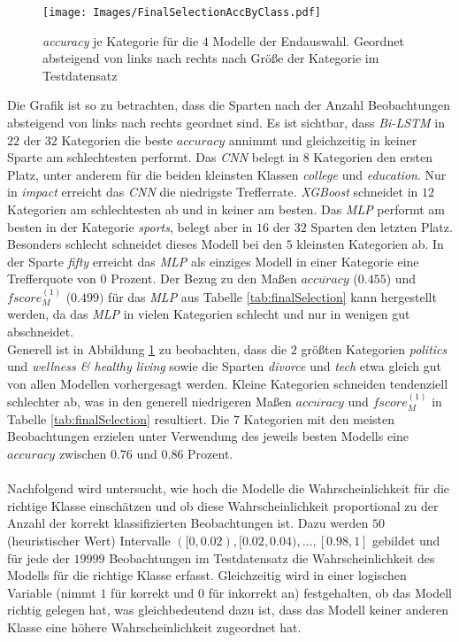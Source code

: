 \documentclass[a4paper,11pt]{article}
\begin{document}
\begin{figure}[ht]
    \centering
\texttt{[image: Images/FinalSelectionAccByClass.pdf]} 
\caption{\textit{accuracy} je Kategorie für die $4$ Modelle der Endauswahl. Geordnet absteigend von links nach rechts nach Größe der Kategorie im Testdatensatz}
\label{abb:AccByClass}
\end{figure}

Die Grafik ist so zu betrachten, dass die Sparten nach der Anzahl Beobachtungen absteigend von links nach rechts geordnet sind. Es ist sichtbar, dass \textit{Bi-LSTM} in $22$ der $32$ Kategorien die beste $accuracy$ annimmt und gleichzeitig in keiner Sparte am schlechtesten performt. Das \textit{CNN} belegt in $8$ Kategorien den ersten Platz, unter anderem für die beiden kleinsten Klassen \textit{college} und \textit{education}. Nur in \textit{impact} erreicht das \textit{CNN} die niedrigste Trefferrate.
\textit{XGBoost} schneidet in $12$ Kategorien am schlechtesten ab und in keiner am besten. Das \textit{MLP} performt am besten in der Kategorie \textit{sports}, belegt aber in $16$ der $32$ Sparten den letzten Platz. Besonders schlecht schneidet dieses Modell bei den $5$ kleinsten Kategorien ab. In der Sparte \textit{fifty} erreicht das \textit{MLP} als einziges Modell in einer Kategorie eine Trefferquote von $0$ Prozent. Der Bezug zu den Maßen $\overline{accuracy}$ ($0.455$) und $fscore_M^{(1)}$ ($0.499)$ für das \textit{MLP} aus Tabelle \ref{tab:finalSelection} kann hergestellt werden, da das \textit{MLP} in vielen Kategorien schlecht und nur in wenigen gut abschneidet. \\
Generell ist in Abbildung \ref{abb:AccByClass} zu beobachten, dass die $2$ größten Kategorien \textit{politics} und \textit{wellness \& healthy living} sowie die Sparten \textit{divorce} und \textit{tech} etwa gleich gut von allen Modellen vorhergesagt werden. Kleine Kategorien schneiden tendenziell schlechter ab, was in den generell niedrigeren Maßen $\overline{accuracy}$ und $fscore_M^{(1)}$ in Tabelle \ref{tab:finalSelection} resultiert. Die $7$ Kategorien mit den meisten Beobachtungen erzielen unter Verwendung des jeweils besten Modells eine $accuracy$ zwischen $0.76$ und $0.86$ Prozent. \\
\\
Nachfolgend wird untersucht, wie hoch die Modelle die Wahrscheinlichkeit für die richtige Klasse einschätzen und ob diese Wahrscheinlichkeit proportional zu der Anzahl der korrekt klassifizierten Beobachtungen ist. Dazu werden $50$ (heuristischer Wert) Intervalle $([0, 0.02), [0.02, 0.04), \dots, [0.98, 1]$ gebildet und für jede der $19999$ Beobachtungen im Testdatensatz die Wahrscheinlichkeit des Modells für die richtige Klasse erfasst. Gleichzeitig wird in einer logischen Variable (nimmt $1$ für korrekt und $0$ für inkorrekt an) festgehalten, ob das Modell richtig gelegen hat, was gleichbedeutend dazu ist, dass das Modell keiner anderen Klasse eine höhere Wahrscheinlichkeit zugeordnet hat.
\end{document}
